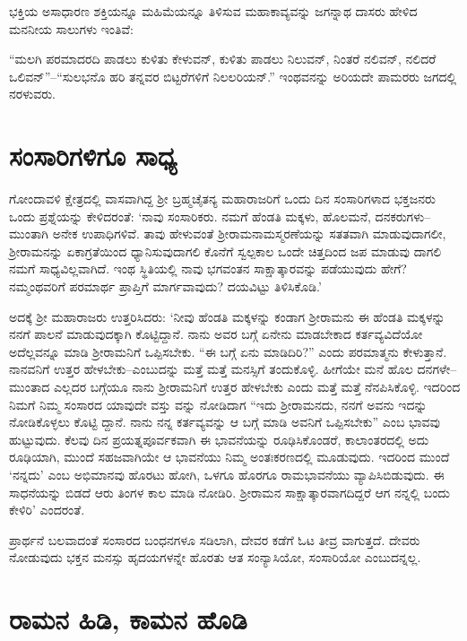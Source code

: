 ಭಕ್ತಿಯ ಅಸಾಧಾರಣ ಶಕ್ತಿಯನ್ನೂ ಮಹಿಮೆಯನ್ನೂ ತಿಳಿಸುವ ಮಹಾಕಾವ್ಯವನ್ನು ಜಗನ್ನಾಥ ದಾಸರು ಹೇಳಿದ ಮನನೀಯ ಸಾಲುಗಳು ಇಂತಿವೆ:

“ಮಲಗಿ ಪರಮಾದರದಿ ಪಾಡಲು ಕುಳಿತು ಕೇಳುವನ್, ಕುಳಿತು ಪಾಡಲು ನಿಲುವನ್, ನಿಂತರೆ ನಲಿವನ್, ನಲಿದರೆ ಒಲಿವನ್​”–“ಸುಲಭನೊ ಹರಿ ತನ್ನವರ ಬಿಟ್ಟರೆಗಳಿಗೆ ನಿಲಲರಿಯನ್.” ಇಂಥವನನ್ನು ಅರಿಯದೇ ಪಾಮರರು ಜಗದಲ್ಲಿ ನರಳುವರು.


\section{ಸಂಸಾರಿಗಳಿಗೂ ಸಾಧ್ಯ}

ಗೋಂದಾವಳಿ ಕ್ಷೇತ್ರದಲ್ಲಿ ವಾಸವಾಗಿದ್ದ ಶ‍್ರೀ ಬ್ರಹ್ಮಚೈತನ್ಯ ಮಹಾರಾಜರಿಗೆ ಒಂದು ದಿನ ಸಂಸಾರಿಗಳಾದ ಭಕ್ತಜನರು ಒಂದು ಪ್ರಶ್ನೆಯನ್ನು ಕೇಳಿದರಂತೆ: ‘ನಾವು ಸಂಸಾರಿಕರು. ನಮಗೆ ಹೆಂಡತಿ ಮಕ್ಕಳು, ಹೊಲಮನೆ, ದನಕರುಗಳು–ಮುಂತಾಗಿ ಅನೇಕ ಉಪಾಧಿಗಳಿವೆ. ತಾವು ಹೇಳುವಂತೆ ಶ‍್ರೀರಾಮನಾಮಸ್ಮರಣೆಯನ್ನು ಸತತವಾಗಿ ಮಾಡುವುದಾಗಲೀ, ಶ‍್ರೀರಾಮನನ್ನು ಏಕಾಗ್ರತೆಯಿಂದ ಧ್ಯಾನಿಸುವುದಾಗಲಿ ಕೊನೆಗೆ ಸ್ವಲ್ಪಕಾಲ ಒಂದೇ ಚಿತ್ತದಿಂದ ಜಪ ಮಾಡುವು ದಾಗಲಿ ನಮಗೆ ಸಾಧ್ಯವಿಲ್ಲವಾಗಿದೆ. ಇಂಥ ಸ್ಥಿತಿಯಲ್ಲಿ ನಾವು ಭಗವಂತನ ಸಾಕ್ಷಾತ್ಕಾರವನ್ನು ಪಡೆಯುವುದು ಹೇಗೆ? ನಮ್ಮಂಥವರಿಗೆ ಪರಮಾರ್ಥ ಪ್ರಾಪ್ತಿಗೆ ಮಾರ್ಗವಾವುದು? ದಯವಿಟ್ಟು ತಿಳಿಸಿಕೊಡಿ.’

ಅದಕ್ಕೆ ಶ‍್ರೀ ಮಹಾರಾಜರು ಉತ್ತರಿಸಿದರು: ‘ನೀವು ಹೆಂಡತಿ ಮಕ್ಕಳನ್ನು ಕಂಡಾಗ ಶ‍್ರೀರಾಮನು ಈ ಹೆಂಡತಿ ಮಕ್ಕಳನ್ನು ನನಗೆ ಪಾಲನೆ ಮಾಡುವುದಕ್ಕಾಗಿ ಕೊಟ್ಟಿದ್ದಾನೆ. ನಾನು ಅವರ ಬಗ್ಗೆ ಏನೇನು ಮಾಡಬೇಕಾದ ಕರ್ತವ್ಯವಿದೆಯೋ ಅದೆಲ್ಲವನ್ನೂ ಮಾಡಿ ಶ‍್ರೀರಾಮನಿಗೆ ಒಪ್ಪಿಸಬೇಕು. “ಈ ಬಗ್ಗೆ ಏನು ಮಾಡಿದಿರಿ?” ಎಂದು ಪರಮಾತ್ಮನು ಕೇಳುತ್ತಾನೆ. ನಾನವನಿಗೆ ಉತ್ತರ ಹೇಳಬೇಕು–ಎಂಬುದನ್ನು ಮತ್ತೆ ಮತ್ತೆ ಮನಸ್ಸಿಗೆ ತಂದುಕೊಳ್ಳಿ. ಹೀಗೆಯೇ ಮನೆ ಹೊಲ ದನಗಳೇ–ಮುಂತಾದ ಎಲ್ಲದರ ಬಗ್ಗೆಯೂ ನಾನು ಶ‍್ರೀರಾಮನಿಗೆ ಉತ್ತರ ಹೇಳಬೇಕು ಎಂದು ಮತ್ತೆ ಮತ್ತೆ ನೆನಪಿಸಿಕೊಳ್ಳಿ. ಇದರಿಂದ ನಿಮಗೆ ನಿಮ್ಮ ಸಂಸಾರದ ಯಾವುದೇ ವಸ್ತು ವನ್ನು ನೋಡಿದಾಗ “ಇದು ಶ‍್ರೀರಾಮನದು, ನನಗೆ ಅವನು ಇದನ್ನು ನೋಡಿಕೊಳ್ಳಲು ಕೊಟ್ಟಿ ದ್ದಾನೆ. ನಾನು ನನ್ನ ಕರ್ತವ್ಯವನ್ನು ಆ ಬಗ್ಗೆ ಮಾಡಿ ಅವನಿಗೆ ಒಪ್ಪಿಸಬೇಕು” ಎಂಬ ಭಾವವು ಹುಟ್ಟುವುದು. ಕೆಲವು ದಿನ ಪ್ರಯತ್ನಪೂರ್ವಕವಾಗಿ ಈ ಭಾವನೆಯನ್ನು ರೂಢಿಸಿಕೊಂಡರೆ, ಕಾಲಾಂತರದಲ್ಲಿ ಅದು ರೂಢಿಯಾಗಿ, ಮುಂದೆ ಸಹಜವಾಗಿಯೇ ಆ ಭಾವನೆಯು ನಿಮ್ಮ ಅಂತಃಕರಣದಲ್ಲಿ ಮೂಡುವುದು. ಇದರಿಂದ ಮುಂದೆ ‘ನನ್ನದು’ ಎಂಬ ಅಭಿಮಾನವು ಹೊರಟು ಹೋಗಿ, ಒಳಗೂ ಹೊರಗೂ ರಾಮಭಾವನೆಯು ವ್ಯಾಪಿಸಿಬಿಡುವುದು. ಈ ಸಾಧನೆಯನ್ನು ಬಿಡದೆ ಆರು ತಿಂಗಳ ಕಾಲ ಮಾಡಿ ನೋಡಿರಿ. ಶ‍್ರೀರಾಮನ ಸಾಕ್ಷಾತ್ಕಾರವಾಗದಿದ್ದರೆ ಆಗ ನನ್ನಲ್ಲಿ ಬಂದು ಕೇಳಿರಿ’ ಎಂದರಂತೆ.

ಪ್ರಾರ್ಥನೆ ಬಲವಾದಂತೆ ಸಂಸಾರದ ಬಂಧನಗಳೂ ಸಡಿಲಾಗಿ, ದೇವರ ಕಡೆಗೆ ಓಟ ತೀವ್ರ ವಾಗುತ್ತದೆ. ದೇವರು ನೋಡುವುದು ಭಕ್ತನ ಮನಸ್ಸು ಹೃದಯಗಳನ್ನೇ ಹೊರತು ಆತ ಸಂನ್ಯಾಸಿಯೋ, ಸಂಸಾರಿಯೋ ಎಂಬುದನ್ನಲ್ಲ.


\section{ರಾಮನ ಹಿಡಿ, ಕಾಮನ ಹೊಡಿ}

